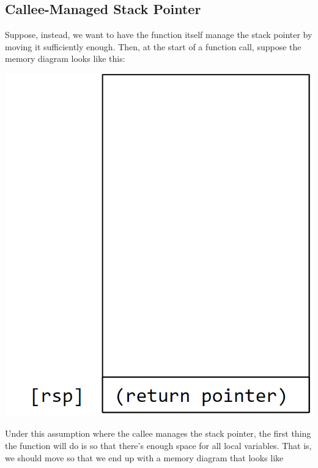 \subsection{Callee-Managed Stack Pointer}
Suppose, instead, we want to have the function itself manage the stack pointer by moving it sufficiently enough. Then, at the start of a function call, suppose the memory diagram looks like this: 
\begin{center}
    \includegraphics[scale=0.3]{assets/callee_stack_mnged_init.png}
\end{center}
Under this assumption where the callee manages the stack pointer, the first thing the function will do is  so that there's enough space for all local variables. That is, we should move \code{[rsp]} so that we end up with a memory diagram that looks like 
